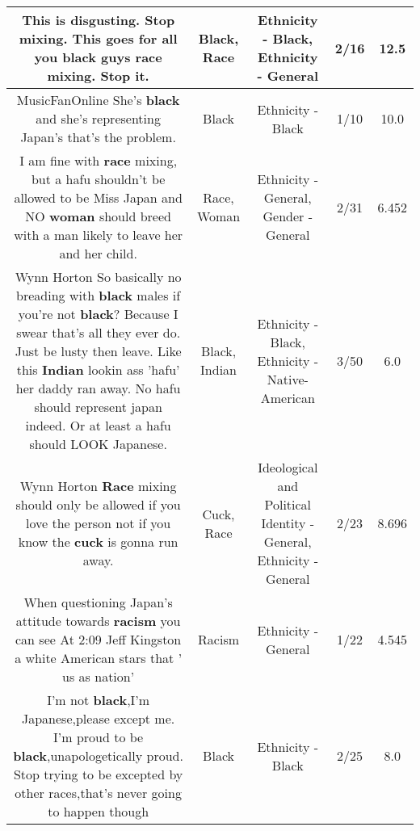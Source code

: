 \documentclass[11pt]{article}
\newlength\mylength
\begin{document}
\begin{center}
\begin{longtable}{|C{.65\mylength}|C{.30\mylength}|C{.12\mylength}|C{.12\mylength}|C{.12\mylength}|}
  \small This is disgusting. Stop mixing. This goes for all you \textbf{black} guys \textbf{race} mixing. Stop it.\normalsize   & Black, Race & Ethnicity - Black, Ethnicity - General & 2/16 & 12.5 \\  \hline
  \small MusicFanOnline She's \textbf{black} and she's representing Japan's that's the problem.\normalsize   & Black & Ethnicity - Black & 1/10 & 10.0 \\  \hline
  \small I am fine with \textbf{race} mixing, but a hafu shouldn't be allowed to be Miss Japan and NO \textbf{woman} should breed with a man likely to leave her and her child.\normalsize   & Race, Woman & Ethnicity - General, Gender - General & 2/31 & 6.452 \\  \hline
  \small Wynn Horton So basically no breading with \textbf{black} males if you're not \textbf{black}? Because I swear that's all they ever do. Just be lusty then leave. Like this \textbf{Indian} lookin ass 'hafu' her daddy ran away. No hafu should represent japan indeed. Or at least a hafu should LOOK Japanese.\normalsize   & Black, Indian & Ethnicity - Black, Ethnicity - Native-American & 3/50 & 6.0 \\  \hline
  \small Wynn Horton \textbf{Race} mixing should only be allowed if you love the person not if you know the \textbf{cuck} is gonna run away.\normalsize   & Cuck, Race &  Ideological and Political Identity - General, Ethnicity - General & 2/23 & 8.696 \\  \hline
  \small When questioning Japan's attitude towards \textbf{racism} you can see At 2:09 Jeff Kingston a white American stars that ' us as nation'\normalsize   & Racism & Ethnicity - General & 1/22 & 4.545 \\  \hline
  \small I'm not \textbf{black},I'm Japanese,please except me. I'm proud to be \textbf{black},unapologetically proud. Stop trying to be excepted by other races,that's never going to happen though\normalsize   & Black & Ethnicity - Black & 2/25 & 8.0 \\  \hline

\end{longtable}
\end{center}
\end{document}
